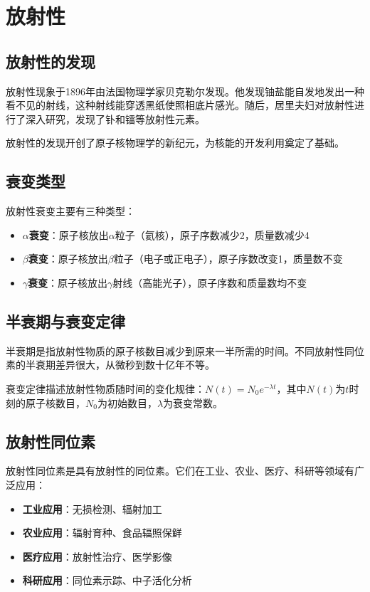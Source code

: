 \documentclass[12pt,UTF8]{ctexbook}
\begin{document}
\chapter{放射性}

\section{放射性的发现}

放射性现象于1896年由法国物理学家贝克勒尔发现。他发现铀盐能自发地发出一种看不见的射线，这种射线能穿透黑纸使照相底片感光。随后，居里夫妇对放射性进行了深入研究，发现了钋和镭等放射性元素。

放射性的发现开创了原子核物理学的新纪元，为核能的开发利用奠定了基础。

\section{衰变类型}

放射性衰变主要有三种类型：

\begin{itemize}[leftmargin=2cm]
    \item \textbf{$\alpha$衰变}：原子核放出$\alpha$粒子（氦核），原子序数减少2，质量数减少4
    \item \textbf{$\beta$衰变}：原子核放出$\beta$粒子（电子或正电子），原子序数改变1，质量数不变
    \item \textbf{$\gamma$衰变}：原子核放出$\gamma$射线（高能光子），原子序数和质量数均不变
\end{itemize}

\section{半衰期与衰变定律}

半衰期是指放射性物质的原子核数目减少到原来一半所需的时间。不同放射性同位素的半衰期差异很大，从微秒到数十亿年不等。

衰变定律描述放射性物质随时间的变化规律：$N(t) = N_0 e^{-\lambda t}$，其中$N(t)$为$t$时刻的原子核数目，$N_0$为初始数目，$\lambda$为衰变常数。

\section{放射性同位素}

放射性同位素是具有放射性的同位素。它们在工业、农业、医疗、科研等领域有广泛应用：

\begin{itemize}[leftmargin=2cm]
    \item \textbf{工业应用}：无损检测、辐射加工
    \item \textbf{农业应用}：辐射育种、食品辐照保鲜
    \item \textbf{医疗应用}：放射性治疗、医学影像
    \item \textbf{科研应用}：同位素示踪、中子活化分析
\end{itemize}
\end{document}
